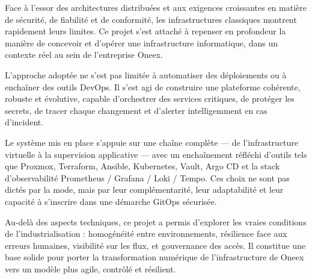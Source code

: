 Face à l’essor des architectures distribuées et aux exigences croissantes en matière de sécurité, de fiabilité et de conformité, les infrastructures classiques montrent rapidement leurs limites. Ce projet s’est attaché à repenser en profondeur la manière de concevoir et d’opérer une infrastructure informatique, dans un contexte réel au sein de l’entreprise Oneex.

L’approche adoptée ne s’est pas limitée à automatiser des déploiements ou à enchaîner des outils DevOps. Il s’est agi de construire une plateforme cohérente, robuste et évolutive, capable d’orchestrer des services critiques, de protéger les secrets, de tracer chaque changement et d’alerter intelligemment en cas d’incident.

Le système mis en place s’appuie sur une chaîne complète — de l’infrastructure virtuelle à la supervision applicative — avec un enchaînement réfléchi d’outils tels que Proxmox, Terraform, Ansible, Kubernetes, Vault, Argo CD et la stack d’observabilité Prometheus / Grafana / Loki / Tempo. Ces choix ne sont pas dictés par la mode, mais par leur complémentarité, leur adaptabilité et leur capacité à s’inscrire dans une démarche GitOps sécurisée.

Au-delà des aspects techniques, ce projet a permis d’explorer les vraies conditions de l’industrialisation : homogénéité entre environnements, résilience face aux erreurs humaines, visibilité sur les flux, et gouvernance des accès. Il constitue une base solide pour porter la transformation numérique de l’infrastructure de Oneex vers un modèle plus agile, contrôlé et résilient.